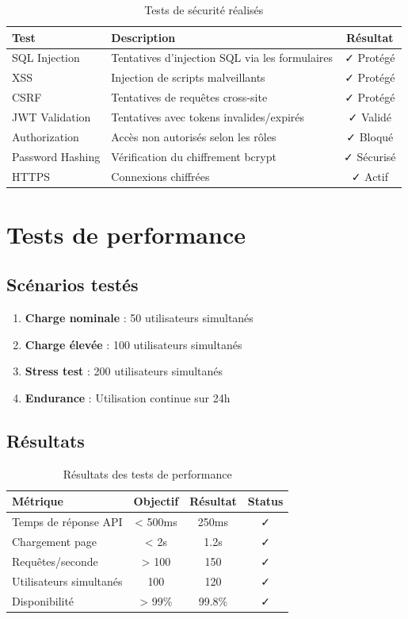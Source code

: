 \begin{table}[H]
\centering
\caption{Tests de sécurité réalisés}
\begin{tabularx}{\textwidth}{|l|X|c|}
\hline
\textbf{Test} & \textbf{Description} & \textbf{Résultat} \\
\hline
SQL Injection & Tentatives d'injection SQL via les formulaires & ✓ Protégé \\
\hline
XSS & Injection de scripts malveillants & ✓ Protégé \\
\hline
CSRF & Tentatives de requêtes cross-site & ✓ Protégé \\
\hline
JWT Validation & Tentatives avec tokens invalides/expirés & ✓ Validé \\
\hline
Authorization & Accès non autorisés selon les rôles & ✓ Bloqué \\
\hline
Password Hashing & Vérification du chiffrement bcrypt & ✓ Sécurisé \\
\hline
HTTPS & Connexions chiffrées & ✓ Actif \\
\hline
\end{tabularx}
\end{table}

\section{Tests de performance}

\subsection{Scénarios testés}

\begin{enumerate}
    \item \textbf{Charge nominale} : 50 utilisateurs simultanés
    \item \textbf{Charge élevée} : 100 utilisateurs simultanés
    \item \textbf{Stress test} : 200 utilisateurs simultanés
    \item \textbf{Endurance} : Utilisation continue sur 24h
\end{enumerate}

\subsection{Résultats}

\begin{table}[H]
\centering
\caption{Résultats des tests de performance}
\begin{tabularx}{\textwidth}{|l|c|c|c|}
\hline
\textbf{Métrique} & \textbf{Objectif} & \textbf{Résultat} & \textbf{Status} \\
\hline
Temps de réponse API & < 500ms & 250ms & ✓ \\
\hline
Chargement page & < 2s & 1.2s & ✓ \\
\hline
Requêtes/seconde & > 100 & 150 & ✓ \\
\hline
Utilisateurs simultanés & 100 & 120 & ✓ \\
\hline
Disponibilité & > 99\% & 99.8\% & ✓ \\
\hline
\end{tabularx}
\end{table}

